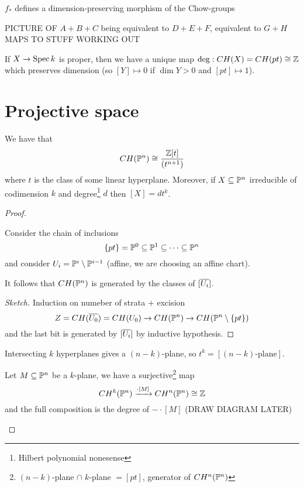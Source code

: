 \begin{theorem}
$f_\ast$ defines a dimension-preserving morphism of the Chow-groups
\end{theorem}

PICTURE OF $A+B+C$ being equivalent to $D+E+F$, equivalent to $G+H$ MAPS TO STUFF WORKING OUT



\begin{proposition}
If $X\to \operatorname{Spec} k$ is proper, then we have a unique map $\deg:CH(X)=CH(pt)\cong \mathbb{Z}$ which preserves dimension (so $[Y]\mapsto 0$ if $\dim Y>0$ and $[pt]\mapsto 1$).
\end{proposition}



\section{Projective space}




\begin{theorem}
We have that
\[CH(\mathbb{P}^n)\cong \frac{\mathbb{Z}[t]}{(t^{n+1})}\]
where $t$ is the class of some linear hyperplane. Moreover, if $X\subseteq \mathbb{P}^n$ irreducible of codimension $k$ and degree\footnote{Hilbert polynomial nonesense} $d$ then $[X]=dt^k$.
\end{theorem}
\begin{proof}
\begin{lemma}
Consider the chain of inclusions
\[\left\{{pt}\right\}=\mathbb{P}^0\subseteq \mathbb{P}^1\subseteq\cdots\subseteq \mathbb{P}^n\]
and consider $U_i=\mathbb{P}^i\setminus \mathbb{P}^{i-1}$ (affine, we are choosing an affine chart).

It follows that $CH(\mathbb{P}^n)$ is generated by the classes of $[\overline{U_i}]$.
\end{lemma}
\begin{proof}[Sketch]
Induction on numeber of strata + excision
\[Z=CH(\overline{U_0})=CH(U_0)\to CH(\mathbb{P}^n)\to CH(\mathbb{P}^n\setminus \left\{{pt}\right\})\]
and the last bit is generated by $[\overline{U_i}]$ by inductive hypothesis.
\end{proof}


\begin{lemma}
Intersecting $k$ hyperplanes gives a $(n-k)$-plane, so $t^k=[(n-k)\text{-plane}]$.
\end{lemma}

\begin{lemma}
Let $M\subseteq \mathbb{P}^n$ be a $k$-plane, we have a surjective\footnote{$(n-k)$-plane $\cap$ $k$-plane $=[pt]$, generator of $CH^n(\mathbb{P}^n)$} map
\[CH^k(\mathbb{P}^n)\xrightarrow{\cdot[M]}CH^n(\mathbb{P}^n)\cong \mathbb{Z}\]
and the full composition is the degree of $-\cdot[M]$ (DRAW DIAGRAM LATER)
\end{lemma}
\end{proof}

